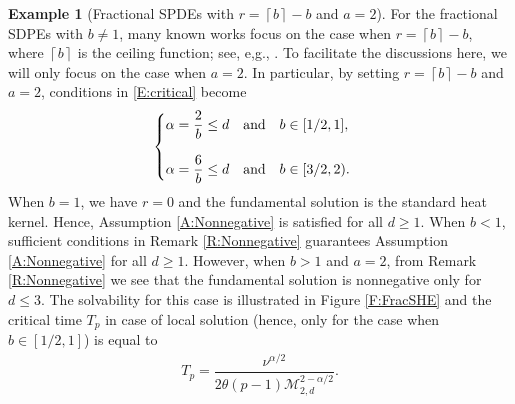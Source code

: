 \documentclass[a4paper,11pt]{article}
\numberwithin{equation}{section}
\numberwithin{equation}{section}
\theoremstyle{plain}
\theoremstyle{definition}
\newtheorem{example}[theorem]{Example}
\newcommand{\Ceil}[1]{\left\lceil #1 \right\rceil}
\begin{document}
\begin{example}[Fractional SPDEs with $r=\Ceil{b}-b$ and $a=2$] \label{Eg:FracSHE}
  For the fractional SDPEs with $b\ne 1$, many known works focus on the case when $r=\Ceil{b}-b$,
  where $\Ceil{b}$ is the ceiling function; see, e,g., \cite{Chen17Tran,MijenaNane15SPA}. To
  facilitate the discussions here, we will only focus on the case when $a=2$. In particular, by
  setting $r=\Ceil{b}-b$ and $a=2$, conditions in \eqref{E:critical} become
  \begin{align} \label{E:CrFrSHE}
    \begin{cases}
      \displaystyle \alpha =\frac{2}{b} \le d \quad  \text{and} \quad b\in [1/2,1], \bigskip\\
      \displaystyle \alpha =\frac{6}{b} \le d \quad  \text{and} \quad b\in [3/2,2).
    \end{cases}
  \end{align}
  When $b=1$, we have $r=0$ and the fundamental solution is the standard heat kernel. Hence,
  Assumption \ref{A:Nonnegative} is satisfied for all $d\ge 1$. When $b<1$, sufficient conditions in
  Remark \ref{R:Nonnegative} guarantees Assumption \ref{A:Nonnegative} for all $d\ge 1$. However,
  when $b>1$ and $a=2$, from Remark \ref{R:Nonnegative} we see that the fundamental solution is
  nonnegative only for $d\le 3$. The solvability for this case is illustrated in Figure
  \ref{F:FracSHE} and the critical time $T_p$ in case of local solution (hence, only for the case
  when $b\in[1/2,1]$) is equal to
  \begin{align} \label{E:TpFracSHE}
    T_p = \dfrac{\nu^{\alpha/2}}{2 \theta (p-1) \mathcal{M}_{2,d}^{2-\alpha/2}}.
  \end{align}
\end{example}
\end{document}
